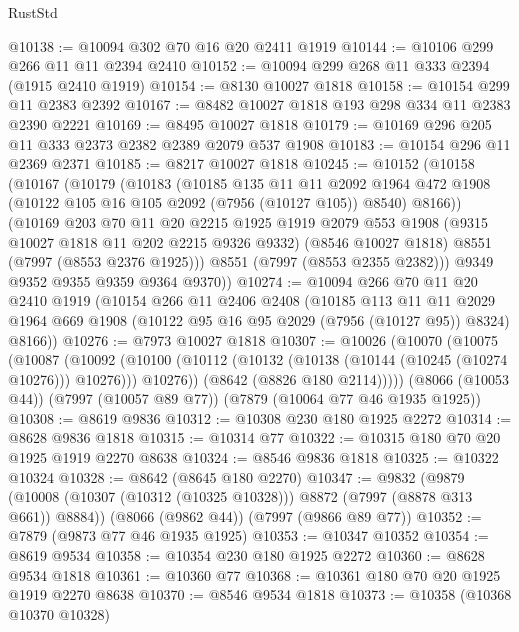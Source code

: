 \begin{lexlean}{RustStd}
\begin{coremodule}
{\begin{coremodule}
{{{{{{{{{{{{{{{{{{{{{{{{{{{{{{{{{{{{{{{{{{{@10138 := @10094 @302 @70 @16 @20 @2411 @1919
@10144 := @10106 @299 @266 @11 @11 @2394 @2410
@10152 := @10094 @299 @268 @11 @333 @2394 (@1915 @2410 @1919)
@10154 := @8130 @10027 @1818
@10158 := @10154 @299 @11 @2383 @2392
@10167 := @8482 @10027 @1818 @193 @298 @334 @11 @2383 @2390 @2221
@10169 := @8495 @10027 @1818
@10179 := @10169 @296 @205 @11 @333 @2373 @2382 @2389 @2079 @537 @1908
@10183 := @10154 @296 @11 @2369 @2371
@10185 := @8217 @10027 @1818
@10245 := @10152
    (@10158
      (@10167
        (@10179
          (@10183
            (@10185
              @135
              @11
              @11
              @2092
              @1964
              @472
              @1908
              (@10122 @105 @16 @105 @2092 (@7956 (@10127 @105)) @8540)
              @8166))
          (@10169
            @203
            @70
            @11
            @20
            @2215
            @1925
            @1919
            @2079
            @553
            @1908
            (@9315 @10027 @1818 @11 @202 @2215 @9326 @9332)
            (@8546 @10027 @1818)
            @8551
            (@7997 (@8553 @2376 @1925)))
          @8551
          (@7997 (@8553 @2355 @2382)))
        @9349
        @9352
        @9355
        @9359
        @9364
        @9370))
@10274 := @10094
    @266
    @70
    @11
    @20
    @2410
    @1919
    (@10154
      @266
      @11
      @2406
      @2408
      (@10185
        @113
        @11
        @11
        @2029
        @1964
        @669
        @1908
        (@10122 @95 @16 @95 @2029 (@7956 (@10127 @95)) @8324)
        @8166))
@10276 := @7973 @10027 @1818
@10307 := @10026
    (@10070
      (@10075
        (@10087
          (@10092
            (@10100 (@10112 (@10132 (@10138 (@10144 (@10245 (@10274 @10276))) @10276))) @10276))
          (@8642 (@8826 @180 @2114)))))
    (@8066 (@10053 @44))
    (@7997 (@10057 @89 @77))
    (@7879 (@10064 @77 @46 @1935 @1925))
@10308 := @8619 @9836
@10312 := @10308 @230 @180 @1925 @2272
@10314 := @8628 @9836 @1818
@10315 := @10314 @77
@10322 := @10315 @180 @70 @20 @1925 @1919 @2270 @8638
@10324 := @8546 @9836 @1818
@10325 := @10322 @10324
@10328 := @8642 (@8645 @180 @2270)
@10347 := @9832
    (@9879 (@10008 (@10307 (@10312 (@10325 @10328))) @8872 (@7997 (@8878 @313 @661)) @8884))
    (@8066 (@9862 @44))
    (@7997 (@9866 @89 @77))
@10352 := @7879 (@9873 @77 @46 @1935 @1925)
@10353 := @10347 @10352
@10354 := @8619 @9534
@10358 := @10354 @230 @180 @1925 @2272
@10360 := @8628 @9534 @1818
@10361 := @10360 @77
@10368 := @10361 @180 @70 @20 @1925 @1919 @2270 @8638
@10370 := @8546 @9534 @1818
@10373 := @10358 (@10368 @10370 @10328)
}}}}}}}}}}}}}}}}}}}}}}}}}}}}}}}}}}}}}}}}}}}
\end{coremodule}}
\end{coremodule}
\end{lexlean}
